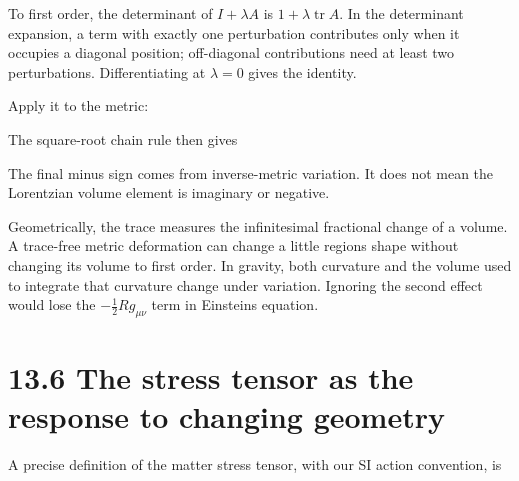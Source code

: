 \documentclass[
  11pt,
  letterpaper,
  oneside,
  openany]{scrbook}
\begin{document}
To first order, the determinant of \(I+\lambda A\) is
\(1+\lambda\operatorname{tr}A\). In the determinant expansion, a term
with exactly one perturbation contributes only when it occupies a
diagonal position; off-diagonal contributions need at least two
perturbations. Differentiating at \(\lambda=0\) gives the identity.

Apply it to the metric:

\begin{center}
\begingroup
{}
\ifdim\wd\grmathbox>\linewidth
\resizebox{\linewidth}{!}{\usebox{\grmathbox}}
\else\usebox{\grmathbox}\fi
\endgroup
\end{center}

The square-root chain rule then gives

\begin{center}
\begingroup
{}
\ifdim\wd\grmathbox>\linewidth
\resizebox{\linewidth}{!}{\usebox{\grmathbox}}
\else\usebox{\grmathbox}\fi
\endgroup
\end{center}

The final minus sign comes from inverse-metric variation. It does not
mean the Lorentzian volume element is imaginary or negative.

Geometrically, the trace measures the infinitesimal fractional change of
a volume. A trace-free metric deformation can change a little
region\textquotesingle s shape without changing its volume to first
order. In gravity, both curvature and the volume used to integrate that
curvature change under variation. Ignoring the second effect would lose
the \(-\frac12Rg_{\mu\nu}\) term in Einstein\textquotesingle s equation.

\hypertarget{the-stress-tensor-as-the-response-to-changing-geometry}{%
\section{13.6 The stress tensor as the response to changing
geometry}\label{the-stress-tensor-as-the-response-to-changing-geometry}}

A precise definition of the matter stress tensor, with our SI action
convention, is

\begin{center}
\begingroup
{}
\ifdim\wd\grmathbox>\linewidth
\resizebox{\linewidth}{!}{\usebox{\grmathbox}}
\else\usebox{\grmathbox}\fi
\endgroup
\end{center}
\end{document}
